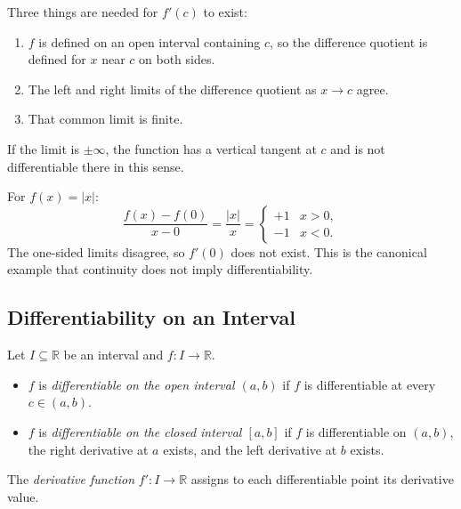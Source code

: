 \begin{remark}
Three things are needed for $f'(c)$ to exist:
\begin{enumerate}
  \item $f$ is defined on an open interval containing $c$,
        so the difference quotient is defined for $x$ near $c$ on both sides.
  \item The left and right limits of the difference quotient as $x \to c$ agree.
  \item That common limit is finite.
\end{enumerate}
If the limit is $\pm\infty$, the function has a vertical tangent at $c$
and is not differentiable there in this sense.
\end{remark}

\begin{remark}
For $f(x) = |x|$:
\[
\frac{f(x) - f(0)}{x - 0} = \frac{|x|}{x} =
\begin{cases} +1 & x > 0, \\ -1 & x < 0. \end{cases}
\]
The one-sided limits disagree, so $f'(0)$ does not exist.
This is the canonical example that continuity does not imply differentiability.
\end{remark}

\subsection{Differentiability on an Interval}

\begin{tcolorbox}[colback=propbox, colframe=propborder, arc=2pt,
  left=6pt, right=6pt, top=4pt, bottom=4pt,
  title={\small\textbf{Definition (\texorpdfstring{%
    \hyperref[prf:differentiable-on-interval]{Differentiable on an Interval}}{Differentiable on an Interval})}},
  fonttitle=\small\bfseries]
\begin{definition}
\label{def:differentiable-on-interval}
Let $I \subseteq \mathbb{R}$ be an interval and $f : I \to \mathbb{R}$.
\begin{itemize}
  \item $f$ is \emph{differentiable on the open interval $(a,b)$} if $f$ is
        differentiable at every $c \in (a,b)$.
  \item $f$ is \emph{differentiable on the closed interval $[a,b]$} if $f$ is
        differentiable on $(a,b)$, the right derivative at $a$ exists, and the
        left derivative at $b$ exists.
\end{itemize}
The \emph{derivative function} $f' : I \to \mathbb{R}$ assigns to each
differentiable point its derivative value.
\end{definition}
\end{tcolorbox}

